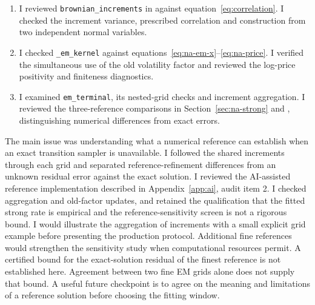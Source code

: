 \begin{enumerate}[leftmargin=2em,itemsep=2pt,topsep=2pt]
\item I reviewed \texttt{brownian\_increments} in  against equation~\eqref{eq:correlation}. I checked the increment variance, prescribed correlation and construction from two independent normal variables.
\item I checked \texttt{\_em\_kernel} against equations~\eqref{eq:na-em-x}--\eqref{eq:na-price}. I verified the simultaneous use of the old volatility factor and reviewed the log-price positivity and finiteness diagnostics.
\item I examined \texttt{em\_terminal}, its nested-grid checks and increment aggregation. I reviewed the three-reference comparisons in Section~\ref{sec:na-strong} and , distinguishing numerical differences from exact errors.
\end{enumerate}
The main issue was understanding what a numerical reference can establish when an exact transition sampler is unavailable. I followed the shared increments through each grid and separated reference-refinement differences from an unknown residual error against the exact solution.
I reviewed the AI-assisted reference implementation described in Appendix~\ref{app:ai}, audit item 2. I checked aggregation and old-factor updates, and retained the qualification that the fitted strong rate is empirical and the reference-sensitivity screen is not a rigorous bound.
I would illustrate the aggregation of increments with a small explicit grid example before presenting the production protocol. Additional fine references would strengthen the sensitivity study when computational resources permit.
A certified bound for the exact-solution residual of the finest reference is not established here. Agreement between two fine EM grids alone does not supply that bound.
A useful future checkpoint is to agree on the meaning and limitations of a reference solution before choosing the fitting window.
\IndividualStatementEnd

